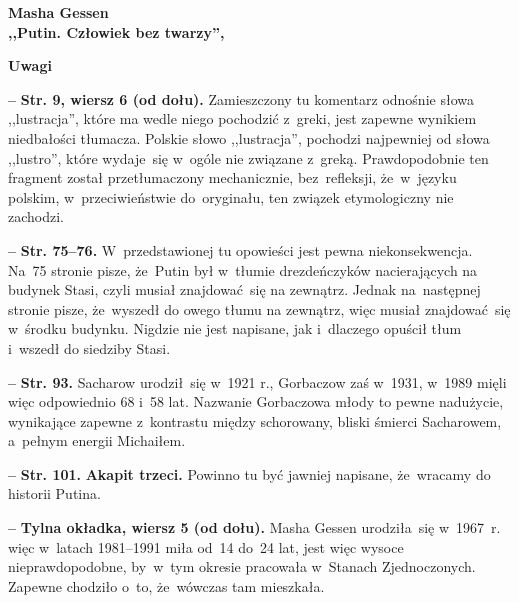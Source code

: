 \documentclass[a4paper,11pt]{article}
\newcommand{\spaceTwo}{2em}
\newcommand{\spaceFour}{0.5em}
\newcommand{\tb}{\textbf}
\newcommand{\noi}{\noindent}
\newcommand{\start}{\noi \tb{--} {}}
\newcommand{\Center}[1]{\begin{center} #1 \end{center}}
\newcommand{\CenterTB}[1]{\Center{\tb{#1}}}
\newcommand{\Str}[1]{\tb{Str. #1.}}
\newcommand{\StrWd}[2]{\tb{Str. #1, wiersz #2 (od dołu).}}
\newcommand{\Work}[1]{ \begin{center} {\large \tb{#1}} \end{center} }
\begin{document}
\vspace{\spaceTwo}





\Work{
  Masha Gessen \\
  ,,Putin. Człowiek bez twarzy'',
  \cite{GessenPutinCzlowiekBezTwarzy12} }


\CenterTB{Uwagi}

\start \StrWd{9}{6} Zamieszczony tu komentarz odnośnie słowa
,,lustracja'', które ma wedle niego pochodzić z~greki, jest zapewne
wynikiem niedbałości tłumacza. Polskie słowo ,,lustracja'', pochodzi
najpewniej od słowa ,,lustro'', które wydaje~się w~ogóle nie związane
z~greką. Prawdopodobnie ten fragment został przetłumaczony
mechanicznie, bez~refleksji, że~w~języku polskim, w~przeciwieństwie
do~oryginału, ten związek etymologiczny nie zachodzi.

\vspace{\spaceFour}


\start \Str{75--76} W~przedstawionej tu opowieści jest pewna
niekonsekwencja. Na~75 stronie pisze, że~Putin był w~tłumie
drezdeńczyków nacierających na budynek Stasi, czyli musiał
znajdować~się na zewnątrz. Jednak na~następnej stronie pisze,
że~wyszedł do owego tłumu na zewnątrz, więc musiał znajdować~się
w~środku budynku. Nigdzie nie jest napisane, jak i~dlaczego opuścił
tłum i~wszedł do siedziby Stasi.

\vspace{\spaceFour}


\start \Str{93} Sacharow urodził~się w~1921 r., Gorbaczow zaś w~1931,
w~1989 mięli więc odpowiednio 68 i~58 lat. Nazwanie Gorbaczowa młody
to pewne nadużycie, wynikające zapewne z~kontrastu między schorowany,
bliski śmierci Sacharowem, a~pełnym energii Michaiłem.

\vspace{\spaceFour}


\start \Str{101} \tb{Akapit trzeci.} Powinno tu być jawniej napisane,
że~wracamy do historii Putina.

\vspace{\spaceFour}


\start \tb{Tylna okładka, wiersz 5 (od dołu).} Masha Gessen
urodziła~się w~1967~r. więc w~latach 1981--1991 miła od~14 do~24 lat,
jest więc wysoce nieprawdopodobne, by~w~tym okresie pracowała
w~Stanach Zjednoczonych. Zapewne chodziło o~to, że~wówczas tam
mieszkała.
\end{document}
